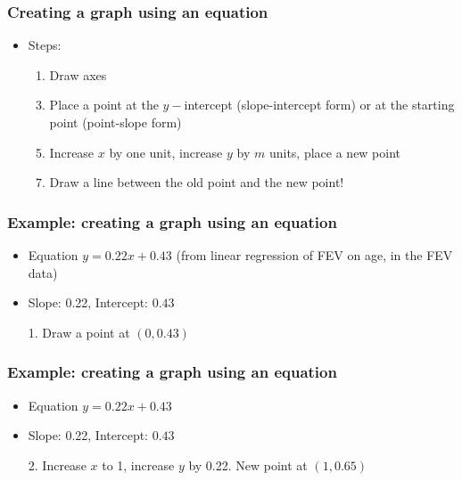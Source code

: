 \documentclass[11pt]{beamer}
\newcommand{\myframe}[1]{\begin{frame} \frametitle{#1}}
\begin{document}
\myframe{Creating a graph using an equation}
\begin{itemize}
\item Steps:
\begin{enumerate}
\item Draw axes
\item[]
\item Place a point at the $y-$intercept (slope-intercept form) or at the starting point (point-slope form)
\item[]
\item Increase $x$ by one unit, increase $y$ by $m$ units, place a new point
\item[]
\item Draw a line between the old point and the new point!
\end{enumerate}
\end{itemize}
\end{frame}

\myframe{Example: creating a graph using an equation}
\centering
\begin{itemize}
\item Equation $y = 0.22x + 0.43$ (from linear regression of FEV on age, in the FEV data)
\item[]
\item Slope: 0.22, Intercept: $0.43$
\item[]
\item[1.] Draw a point at $(0, 0.43)$
\end{itemize}
\end{frame}

\myframe{Example: creating a graph using an equation}
\centering
\begin{itemize}
\item Equation $y = 0.22x + 0.43$
\item[]
\item Slope: 0.22, Intercept: $0.43$
\item[]
\item[2.] Increase $x$ to 1, increase $y$ by 0.22. New point at $(1, 0.65)$
\end{itemize}
\end{frame}
\end{document}
